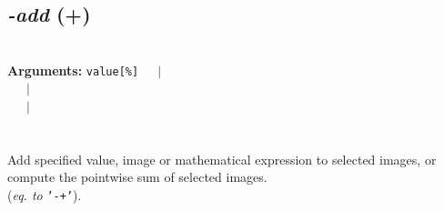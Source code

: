 \documentclass[a4paper,11pt,twoside]{book}
\begin{document}
\subsection{\emph{-add} (+)}\vspace*{-0.5em}
~\\\textbf{Arguments: } 
{\small \texttt{value[\%]}}~~~$|$\\
\hspace*{2.2cm}{\small \texttt{[image]}}~~~$|$\\
~~~$|$\\
\\~\\
Add specified value, image or mathematical expression to selected images,
or compute the pointwise sum of selected images.
~\\(\emph{eq. to} {\small \texttt{'-+'}}).
\end{document}
